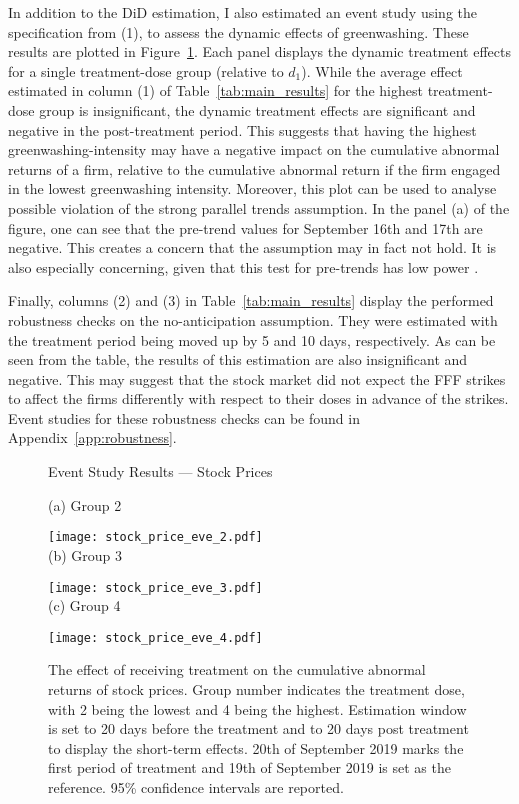 \documentclass[12pt]{article}
\begin{document}
In addition to the DiD estimation, I also estimated an event study using the specification from (1), to assess the dynamic effects of greenwashing. These results are plotted in Figure~\ref{fig:eve_stock}. Each panel displays the dynamic treatment effects for a single treatment-dose group (relative to $d_1$). While the average effect estimated in column (1) of Table~\ref{tab:main_results} for the highest treatment-dose group is insignificant, the dynamic treatment effects are significant and negative in the post-treatment period. This suggests that having the highest greenwashing-intensity may have a negative impact on the cumulative abnormal returns of a firm, relative to the cumulative abnormal return if the firm engaged in the lowest greenwashing intensity. Moreover, this plot can be used to analyse possible violation of the strong parallel trends assumption. In the panel (a) of the figure, one can see that the pre-trend values for September 16th and 17th are negative. This creates a concern that the assumption may in fact not hold. It is also especially concerning, given that this test for pre-trends has low power \parencite{rothWhatsTrendingDifferenceindifferences2023}.
                            

Finally, columns (2) and (3) in Table~\ref{tab:main_results} display the performed robustness checks on the no-anticipation assumption. They were estimated with the treatment period being moved up by 5 and 10 days, respectively. As can be seen from the table, the results of this estimation are also insignificant and negative. This may suggest that the stock market did not expect the FFF strikes to affect the firms differently with respect to their doses in advance of the strikes. Event studies for these robustness checks can be found in Appendix~\ref{app:robustness}.


\begin{figure}
    \caption{Event Study Results --- Stock Prices}\label{fig:eve_stock}
    \centering
    
    (a) Group 2
    
    \texttt{[image: stock\_price\_eve\_2.pdf]} \\
    
    (b) Group 3
    
    \texttt{[image: stock\_price\_eve\_3.pdf]} \\
    
    (c) Group 4
    
    \texttt{[image: stock\_price\_eve\_4.pdf]}
    
    \captionsetup{font=footnotesize}
    \caption*{The effect of receiving treatment on the cumulative abnormal returns of stock prices. Group number indicates the treatment dose, with 2 being the lowest and 4 being the highest. Estimation window is set to 20 days before the treatment and to 20 days post treatment to display the short-term effects. 20th of September 2019 marks the first period of treatment and 19th of September 2019 is set as the reference. 95\% confidence intervals are reported.}
\end{figure}
\end{document}

